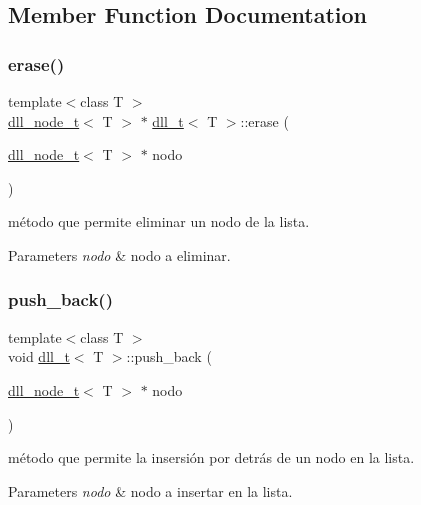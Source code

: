 \subsection{Member Function Documentation}
\mbox{\label{classdll__t_ad75998a73ef06762e317723dae45ae2c}} 
\subsubsection{\texorpdfstring{erase()}{erase()}}
{\footnotesize\ttfamily template$<$class T $>$ \\
\hyperlink{classdll__node__t}{dll\+\_\+node\+\_\+t}$<$ T $>$ $\ast$ \hyperlink{classdll__t}{dll\+\_\+t}$<$ T $>$\+::erase (\begin{DoxyParamCaption}\item[{\hyperlink{classdll__node__t}{dll\+\_\+node\+\_\+t}$<$ T $>$ $\ast$}]{nodo }\end{DoxyParamCaption})}



método que permite eliminar un nodo de la lista. 


\begin{DoxyParams}{Parameters}
{\em nodo} & nodo a eliminar. \\
\hline
\end{DoxyParams}
\mbox{\label{classdll__t_aa8cd054c192aa86ac418a2941c1c02ba}} 
\subsubsection{\texorpdfstring{push\+\_\+back()}{push\_back()}}
{\footnotesize\ttfamily template$<$class T $>$ \\
void \hyperlink{classdll__t}{dll\+\_\+t}$<$ T $>$\+::push\+\_\+back (\begin{DoxyParamCaption}\item[{\hyperlink{classdll__node__t}{dll\+\_\+node\+\_\+t}$<$ T $>$ $\ast$}]{nodo }\end{DoxyParamCaption})}



método que permite la insersión por detrás de un nodo en la lista. 


\begin{DoxyParams}{Parameters}
{\em nodo} & nodo a insertar en la lista. \\
\hline
\end{DoxyParams}
\mbox{\label{classdll__t_aa38df54cd7f2a5e60198169a9b4cda26}} 
